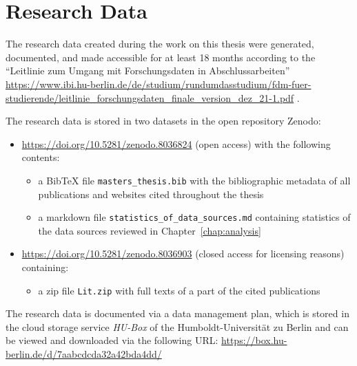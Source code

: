 \chapter{Research Data}
\label{chap:DMP}

The research data created during the work on this thesis 
were generated, documented, and made accessible for at least 18 months
according to the \enquote{Leitlinie zum Umgang mit Forschungsdaten in Abschlussarbeiten}
\url{https://www.ibi.hu-berlin.de/de/studium/rundumdasstudium/fdm-fuer-studierende/leitlinie_forschungsdaten_finale_version_dez_21-1.pdf} .

The research data is stored in two datasets in the open repository Zenodo:
%
\begin{itemize}
  \item
    \url{https://doi.org/10.5281/zenodo.8036824} (open access) with the following contents:
    \begin{itemize}
      \item
        a BibTeX file \verb!masters_thesis.bib! with the bibliographic metadata of all publications and websites cited throughout the thesis
      \item
        a markdown file \verb!statistics_of_data_sources.md! containing statistics of the data sources reviewed in Chapter~\ref{chap:analysis}
    \end{itemize}
  \item
    \url{https://doi.org/10.5281/zenodo.8036903} (closed access for licensing reasons) containing:
    \begin{itemize}
      \item
        a zip file \verb!Lit.zip! with full texts of a part of the cited publications
    \end{itemize}    
\end{itemize}

The research data is documented via a data management plan,
which is stored in the cloud storage service \emph{HU-Box} of the Humboldt-Universität zu Berlin
and can be viewed and downloaded via the following URL: \url{https://box.hu-berlin.de/d/7aabcdcda32a42bda4dd/}


%
%


